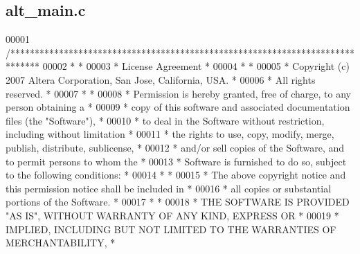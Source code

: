 \subsection{alt\+\_\+main.\+c}
\label{alt__main_8c_source}

\begin{DoxyCode}
00001 \textcolor{comment}{/******************************************************************************}
00002 \textcolor{comment}{*                                                                             *}
00003 \textcolor{comment}{* License Agreement                                                           *}
00004 \textcolor{comment}{*                                                                             *}
00005 \textcolor{comment}{* Copyright (c) 2007 Altera Corporation, San Jose, California, USA.           *}
00006 \textcolor{comment}{* All rights reserved.                                                        *}
00007 \textcolor{comment}{*                                                                             *}
00008 \textcolor{comment}{* Permission is hereby granted, free of charge, to any person obtaining a     *}
00009 \textcolor{comment}{* copy of this software and associated documentation files (the "Software"),  *}
00010 \textcolor{comment}{* to deal in the Software without restriction, including without limitation   *}
00011 \textcolor{comment}{* the rights to use, copy, modify, merge, publish, distribute, sublicense,    *}
00012 \textcolor{comment}{* and/or sell copies of the Software, and to permit persons to whom the       *}
00013 \textcolor{comment}{* Software is furnished to do so, subject to the following conditions:        *}
00014 \textcolor{comment}{*                                                                             *}
00015 \textcolor{comment}{* The above copyright notice and this permission notice shall be included in  *}
00016 \textcolor{comment}{* all copies or substantial portions of the Software.                         *}
00017 \textcolor{comment}{*                                                                             *}
00018 \textcolor{comment}{* THE SOFTWARE IS PROVIDED "AS IS", WITHOUT WARRANTY OF ANY KIND, EXPRESS OR  *}
00019 \textcolor{comment}{* IMPLIED, INCLUDING BUT NOT LIMITED TO THE WARRANTIES OF MERCHANTABILITY,    *}

\end{DoxyCode}
